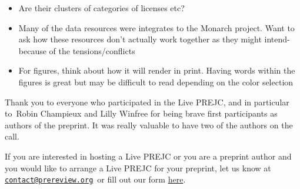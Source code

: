 \documentclass[10pt]{article}
\providecommand{\tightlist}{\setlength{\itemsep}{0pt}\setlength{\parskip}{0pt}}%
\begin{document}
\begin{itemize}
\tightlist
\item
  Are their clusters of categories of licenses etc?
\end{itemize}

\begin{itemize}
\tightlist
\item
  Many of the data resources were integrates to the Monarch project.
  Want to ask how these resources don't actually work together as they
  might intend-because of the tensions/conflicts
\end{itemize}

\begin{itemize}
\tightlist
\item
  For figures, think about how it will render in print. Having words
  within the figures is great but may be difficult to read depending on
  the color selection
\end{itemize}

\par\null\par\null

Thank you to everyone who participated in the Live PREJC, and in
particular to~Robin Champieux and Lilly Winfree for being brave first
participants as authors of the preprint. It was really valuable to have
two of the authors on the call.

\par\null

If you are interested in hosting a Live PREJC or you are a preprint
author and you would like to arrange a Live PREJC for your preprint, let
us know at
\href{mailto:contact@prereview.org}{\nolinkurl{contact@prereview.org}}~or
fill out our form
\href{https://docs.google.com/forms/d/e/1FAIpQLSdlpfxK0XEeVbUD7aHBKLf6g7rOups-uS2ZytpDKdHNBHwNZg/viewform?usp=sf_link}{here}.

\FloatBarrier
\end{document}

